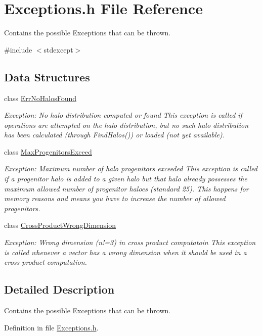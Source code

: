 \section{Exceptions.h File Reference}
\label{Exceptions_8h}


Contains the possible Exceptions that can be thrown.  


{\ttfamily \#include $<$stdexcept$>$}\par
\subsection*{Data Structures}
\begin{DoxyCompactItemize}
\item 
class \hyperlink{classErrNoHalosFound}{ErrNoHalosFound}
\begin{DoxyCompactList}\small\item\em Exception: No halo distribution computed or found This exception is called if operations are attempted on the halo distribution, but no such halo distribution has been calculated (through FindHalos()) or loaded (not yet available). \item\end{DoxyCompactList}\item 
class \hyperlink{classMaxProgenitorsExceed}{MaxProgenitorsExceed}
\begin{DoxyCompactList}\small\item\em Exception: Maximum number of halo progenitors exceeded This exception is called if a progenitor halo is added to a given halo but that halo already possesses the maximum allowed number of progenitor haloes (standard 25). This happens for memory reasons and means you have to increase the number of allowed progenitors. \item\end{DoxyCompactList}\item 
class \hyperlink{classCrossProductWrongDimension}{CrossProductWrongDimension}
\begin{DoxyCompactList}\small\item\em Exception: Wrong dimension (n!=3) in cross product computatoin This exception is called whenever a vector has a wrong dimension when it should be used in a cross product computation. \item\end{DoxyCompactList}\end{DoxyCompactItemize}


\subsection{Detailed Description}
Contains the possible Exceptions that can be thrown. 

Definition in file \hyperlink{Exceptions_8h_source}{Exceptions.h}.

